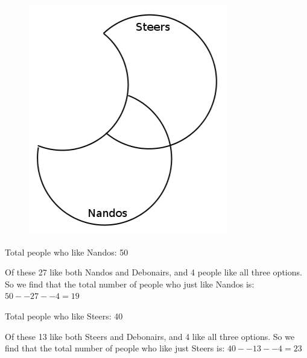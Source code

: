 {\begin{mdframed}[linewidth=4, leftmargin=40, rightmargin=40]
\begin{exercise}
\begin{enumerate}[noitemsep, label=\textbf{Step} \textbf{\arabic*}. ]
	\begin{figure}[H] %
    \begin{center}
    \label{m39377*id533!!!underscore!!!media}\label{m39377*id533!!!underscore!!!printimage}\includegraphics{col11306.imgs/m39377_Vennwex2.png} %
        
      \vspace{2pt}
    \vspace{.1in}
    
    \end{center}

 \end{figure}   

    \addtocounter{footnote}{-0}
    
Total people who like Nandos: 50\newline
    
Of these 27 like both Nandos and Debonairs, and 4 people like all three options. So we find that the total number of people who just like Nandos is: \begin{math}50--27--4=19\end{math}\newline
    
Total people who like Steers: 40\newline
    
Of these 13 like both Steers and Debonairs, and 4 like all three options. So we find that the total number of people who like just Steers is: \begin{math}40--13--4=23\end{math}\newline
    

\end{enumerate}
\end{exercise}
\end{mdframed}}
